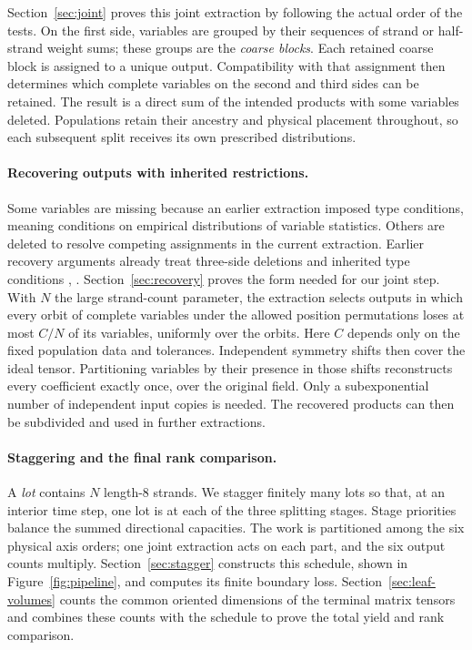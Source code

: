 Section~\ref{sec:joint} proves this joint extraction by following the
actual order of the tests.  On the first side, variables are grouped by
their sequences of strand or half-strand weight sums; these groups are
the \emph{coarse blocks}.  Each retained coarse block is assigned to a
unique output.  Compatibility with that assignment then determines which
complete variables on the second and third sides
can be retained.  The result is a direct sum of the intended products
with some variables deleted.  Populations retain their ancestry and
physical placement throughout, so each subsequent split receives its
own prescribed distributions.

\paragraph{Recovering outputs with inherited restrictions.}
Some variables are missing because an earlier extraction imposed type
conditions, meaning conditions on empirical distributions of variable
statistics.  Others are deleted to resolve competing assignments in the
current extraction.  Earlier recovery arguments already treat
three-side deletions and inherited type conditions
\cite[Section~7]{VXXZ2023}, \cite[Section~6.5]{MoreAsymmetry2026}.
Section~\ref{sec:recovery} proves the form needed for our joint step.
With $N$ the large strand-count parameter, the extraction selects outputs
in which every orbit of complete variables under the allowed position
permutations loses at most $C/N$ of its variables, uniformly over the orbits.  Here $C$ depends only on
the fixed population data and tolerances.  Independent symmetry shifts
then cover the ideal tensor.  Partitioning variables by their presence
in those shifts reconstructs every coefficient exactly once, over the
original field.  Only a subexponential number of independent input copies
is needed.  The recovered products can then be subdivided and used in
further extractions.

\paragraph{Staggering and the final rank comparison.}
A \emph{lot} contains $N$ length-$8$ strands.  We stagger finitely many
lots so that, at an interior time step, one lot is at each of the three
splitting stages.  Stage priorities balance the summed directional
capacities.  The work is partitioned among the six physical axis orders;
one joint extraction acts on each part, and the six output counts
multiply.  Section~\ref{sec:stagger} constructs this schedule, shown in
Figure~\ref{fig:pipeline}, and computes its finite boundary loss.
Section~\ref{sec:leaf-volumes} counts the common oriented dimensions
of the terminal matrix tensors and combines these counts with the
schedule to prove the total yield and rank comparison.

